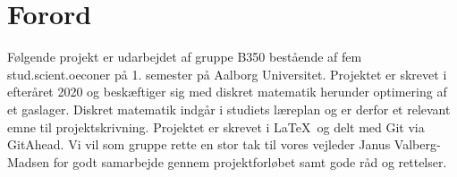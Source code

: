 \chapter{Forord}
Følgende projekt er udarbejdet af gruppe B350 bestående af fem stud.scient.oeconer på 1. semester på Aalborg Universitet. Projektet er skrevet i efteråret 2020 og beskæftiger sig med diskret matematik herunder optimering af et gaslager. Diskret matematik indgår i studiets læreplan og er derfor et relevant emne til projektskrivning. Projektet er skrevet i \LaTeX \ og delt med Git via GitAhead.
Vi vil som gruppe rette en stor tak til vores vejleder Janus Valberg-Madsen for godt samarbejde gennem projektforløbet samt gode råd og rettelser.
